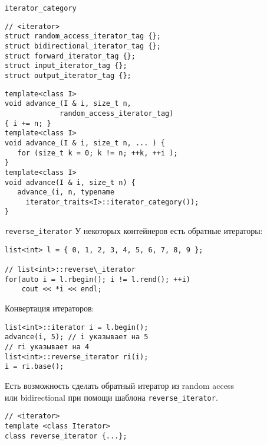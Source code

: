 \documentclass[aspectration=1610,t]{beamer}
\begin{document}
\begin{frame}[fragile]{{\tt iterator\_category}}
\begin{lstlisting}
// <iterator>
struct random_access_iterator_tag {};
struct bidirectional_iterator_tag {};
struct forward_iterator_tag {};
struct input_iterator_tag {};
struct output_iterator_tag {};
\end{lstlisting}
\begin{lstlisting}
template<class I>
void advance_(I & i, size_t n,
             random_access_iterator_tag) 
{ i += n; }
template<class I>
void advance_(I & i, size_t n, ... ) { 
   for (size_t k = 0; k != n; ++k, ++i );
}
template<class I>
void advance(I & i, size_t n) {
   advance_(i, n, typename 
     iterator_traits<I>::iterator_category());
}
\end{lstlisting}
\end{frame}

\begin{frame}[fragile]{{\tt reverse\_iterator}}
    У некоторых контейнеров есть обратные итераторы: 
\begin{lstlisting}
list<int> l = { 0, 1, 2, 3, 4, 5, 6, 7, 8, 9 }; 

// list<int>::reverse\_iterator
for(auto i = l.rbegin(); i != l.rend(); ++i)
    cout << *i << endl;
\end{lstlisting}

Конвертация итераторов:
\begin{lstlisting}
list<int>::iterator i = l.begin();
advance(i, 5); // i указывает на 5
// ri указывает на 4
list<int>::reverse_iterator ri(i); 
i = ri.base();
\end{lstlisting}

Есть возможность сделать обратный итератор из random access\\ или bidirectional при помощи шаблона 
\texttt{reverse\_iterator}.
\begin{lstlisting}
// <iterator>
template <class Iterator> 
class reverse_iterator {...};
\end{lstlisting}
\end{frame}
\end{document}
